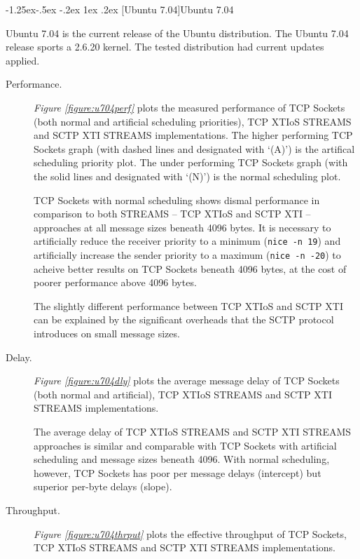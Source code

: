 \documentclass[letterpaper,final,notitlepage,twocolumn,10pt,twoside]{article}
\makeatletter
\let\normalsize = \small
\let\small = \footnotesize
\let\footnotesize = \scriptsize
\let\scriptsize = \tiny
\renewcommand\subsubsection{\@startsection{subsubsection}{3}{\z@}%
                                     {-1.25ex\@plus -.5ex \@minus -.2ex}%
                                     {1ex \@plus .2ex}%
                                     {\normalfont\normalsize\bfseries}}
\makeatother
\begin{document}
\subsubsection[Ubuntu 7.04]{Ubuntu 7.04}

Ubuntu 7.04 is the current release of the Ubuntu distribution.  The Ubuntu 7.04 release sports a
2.6.20 kernel.  The tested distribution had current updates applied.

\begin{description}

\item[Performance.]

\textit{Figure \ref{figure:u704perf}}
plots the measured performance of TCP Sockets (both normal and artificial scheduling priorities),
TCP XTIoS STREAMS and SCTP XTI STREAMS implementations.
The higher performing TCP Sockets graph (with dashed lines and designated with `(A)') is the
artifical scheduling priority plot.  The under performing TCP Sockets graph (with the solid lines
and designated with `(N)') is the normal scheduling plot.

TCP Sockets with normal scheduling shows dismal performance in comparison to both STREAMS -- TCP
XTIoS and SCTP XTI -- approaches at all message sizes beneath 4096 bytes.  It is necessary to
artificially reduce the receiver priority to a minimum (\texttt{nice -n 19}) and artificially
increase the sender priority to a maximum (\texttt{nice -n -20}) to acheive better results on TCP
Sockets beneath 4096 bytes, at the cost of poorer performance above 4096 bytes.

The slightly different performance between TCP XTIoS and SCTP XTI can be explained by the
significant overheads that the SCTP protocol introduces on small message sizes.

\item[Delay.]

\textit{Figure \ref{figure:u704dly}}
plots the average message delay of TCP Sockets (both normal and artificial), TCP XTIoS STREAMS and
SCTP XTI STREAMS implementations.

The average delay of TCP XTIoS STREAMS and SCTP XTI STREAMS approaches is similar and comparable
with TCP Sockets with artificial scheduling and message sizes beneath 4096.  With normal scheduling,
however, TCP Sockets has poor per message delays (intercept) but superior per-byte delays (slope).

\item[Throughput.]

\textit{Figure \ref{figure:u704thrput}}
plots the effective throughput of TCP Sockets, TCP XTIoS STREAMS and SCTP XTI STREAMS
implementations.


\end{description}
\end{document}
